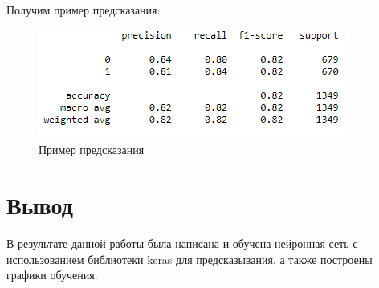 \documentclass[a4paper,14pt]{article}
\begin{document}
Получим пример предсказания: 

\begin{figure}[h!]
\centering
\includegraphics[scale=0.8]{pics/10.png}
\caption{Пример предсказания}
\end{figure}

\section{Вывод}
В результате данной работы была написана и обучена нейронная сеть с использованием библиотеки keras для предсказывания, а также построены графики обучения.
\end{document}

